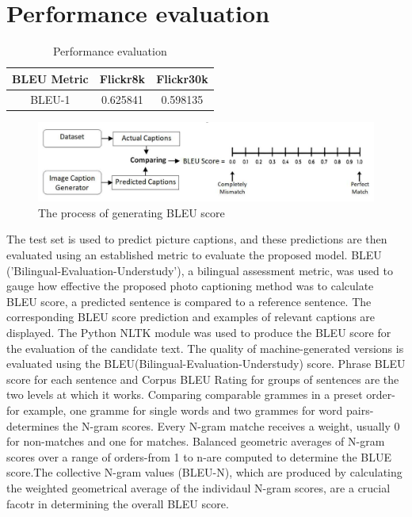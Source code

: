 \documentclass[oneside,a4paper,12pt]{report}
\begin{document}
\section{Performance evaluation}


\begin{table}[!htbp]
\begin{center}
\def\arraystretch{1.9}
  \begin{tabular}{| c | c | c |}
\hline
 \hspace{6.5mm}BLEU Metric \hspace{6.5mm} &	 \hspace{6.5mm}Flickr8k \hspace{6.5mm}&	 \hspace{6.5mm}Flickr30k \hspace{6.5mm} \\
\hline
BLEU-1 & 0.625841 & 0.598135\\
\hline





\end{tabular}
 \caption {Performance evaluation}
 \label{tab:CompAna}
\end{center}

\end{table}

\begin{figure}[H]
\begin{center}
\includegraphics[width=0.8\linewidth]{performance}
\caption{The process of generating BLEU score}
\label{Fig:f2}
\end{center}
\end{figure}
The test set is used to predict picture captions, and these predictions are then evaluated using an established metric to evaluate the proposed model. BLEU ('Bilingual-Evaluation-Understudy'), a bilingual assessment metric, was used to gauge how effective the proposed photo captioning method was
to calculate BLEU score, a predicted sentence is compared to a reference sentence. The corresponding BLEU score prediction and examples of relevant captions are displayed. The Python NLTK module was used to produce the BLEU score for the evaluation of the candidate text. The quality of machine-generated versions is evaluated using the BLEU(Bilingual-Evaluation-Understudy) score. Phrase BLEU score for each sentence and Corpus BLEU Rating for groups of sentences are the two levels at which it works. Comparing comparable grammes in a preset order-for example, one gramme for single words and two grammes for word pairs-determines the N-gram scores. Every N-gram matche receives a weight, usually 0 for non-matches and one for matches. Balanced geometric averages of N-gram scores over a range of orders-from 1 to n-are computed to determine the BLUE score.The collective N-gram values (BLEU-N), which are produced by calculating the weighted geometrical average of the individaul N-gram scores, are a crucial facotr in determining the overall BLEU score.
\end{document}
